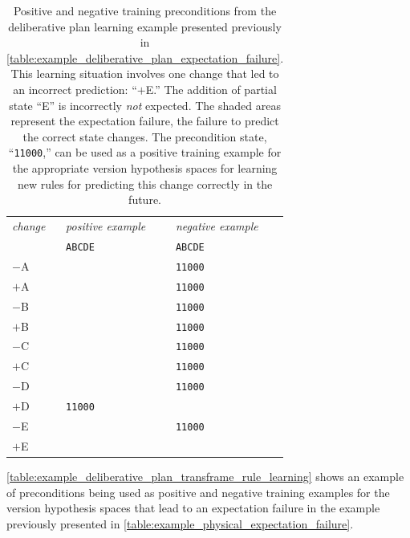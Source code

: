 \begin{table}
\centering
\begin{tabular}{p{1cm}|p{1.5cm}|p{1.5cm}|}
{\emph{change}}        & {\emph{positive example}}      & {\emph{negative example}}      \\
                       & {\tt{ABCDE}}                   & {\tt{ABCDE}}                   \\
\hline
$-$A                   &                                & {\tt{11000}}                   \\
$+$A                   &                                & {\tt{11000}}                   \\
$-$B                   &                                & {\tt{11000}}                   \\
$+$B                   &                                & {\tt{11000}}                   \\
$-$C                   &                                & {\tt{11000}}                   \\
$+$C                   &                                & {\tt{11000}}                   \\
$-$D                   &                                & {\tt{11000}}                   \\
$+$D                   & {\tt{11000}}                   &                                \\
$-$E                   &                                & {\tt{11000}}                   \\
\cellcolor{red!10}$+$E & \cellcolor{red!10}{\tt{11000}} & \cellcolor{red!10}             \\
\hline
\end{tabular}
\caption[Positive and negative training preconditions from the
  deliberative plan learning example presented previously in
  {\mbox{\autoref{table:example_physical_expectation_failure}}}.]{Positive
  and negative training preconditions from the deliberative plan
  learning example presented previously in
  {\mbox{\autoref{table:example_deliberative_plan_expectation_failure}}}.
  This learning situation involves one change that led to an incorrect
  prediction: ``$+$E.''  The addition of partial state ``E'' is
  incorrectly {\emph{not}} expected.  The shaded areas represent the
  expectation failure, the failure to predict the correct state
  changes.  The precondition state, ``{\tt{11000}},'' can be used as a
  positive training example for the appropriate version hypothesis
  spaces for learning new rules for predicting this change correctly
  in the future.}
\label{table:example_deliberative_plan_transframe_rule_learning}
\end{table}
{\mbox{\autoref{table:example_deliberative_plan_transframe_rule_learning}}}
shows an example of preconditions being used as positive and negative
training examples for the version hypothesis spaces that lead to an
expectation failure in the example previously presented in
{\mbox{\autoref{table:example_physical_expectation_failure}}}.

